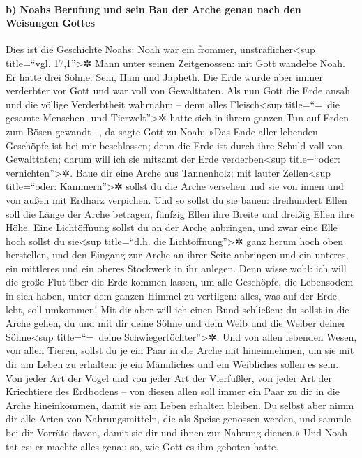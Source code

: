 \hypertarget{b-noahs-berufung-und-sein-bau-der-arche-genau-nach-den-weisungen-gottes}{%
\paragraph{b) Noahs Berufung und sein Bau der Arche genau nach den
Weisungen
Gottes}\label{b-noahs-berufung-und-sein-bau-der-arche-genau-nach-den-weisungen-gottes}}

 Dies ist die Geschichte Noahs: Noah war ein frommer,
unsträflicher\textless sup title=``vgl. 17,1''\textgreater✲ Mann unter
seinen Zeitgenossen: mit Gott wandelte Noah.  Er hatte
drei Söhne: Sem, Ham und Japheth.  Die Erde wurde aber
immer verderbter vor Gott und war voll von Gewalttaten. 
Als nun Gott die Erde ansah und die völlige Verderbtheit wahrnahm --
denn alles Fleisch\textless sup title=``=~die gesamte Menschen- und
Tierwelt''\textgreater✲ hatte sich in ihrem ganzen Tun auf Erden zum
Bösen gewandt --,  da sagte Gott zu Noah: »Das Ende aller
lebenden Geschöpfe ist bei mir beschlossen; denn die Erde ist durch ihre
Schuld voll von Gewalttaten; darum will ich sie mitsamt der Erde
verderben\textless sup title=``oder: vernichten''\textgreater✲.
 Baue dir eine Arche aus Tannenholz; mit lauter
Zellen\textless sup title=``oder: Kammern''\textgreater✲ sollst du die
Arche versehen und sie von innen und von außen mit Erdharz verpichen.
 Und so sollst du sie bauen: dreihundert Ellen soll die
Länge der Arche betragen, fünfzig Ellen ihre Breite und dreißig Ellen
ihre Höhe.  Eine Lichtöffnung sollst du an der Arche
anbringen, und zwar eine Elle hoch sollst du sie\textless sup
title=``d.h. die Lichtöffnung''\textgreater✲ ganz herum hoch oben
herstellen, und den Eingang zur Arche an ihrer Seite anbringen und ein
unteres, ein mittleres und ein oberes Stockwerk in ihr anlegen.
 Denn wisse wohl: ich will die große Flut über die Erde
kommen lassen, um alle Geschöpfe, die Lebensodem in sich haben, unter
dem ganzen Himmel zu vertilgen: alles, was auf der Erde lebt, soll
umkommen!  Mit dir aber will ich einen Bund schließen: du
sollst in die Arche gehen, du und mit dir deine Söhne und dein Weib und
die Weiber deiner Söhne\textless sup title=``=~deine
Schwiegertöchter''\textgreater✲.  Und von allen lebenden
Wesen, von allen Tieren, sollst du je ein Paar in die Arche mit
hineinnehmen, um sie mit dir am Leben zu erhalten: je ein Männliches und
ein Weibliches sollen es sein.  Von jeder Art der Vögel
und von jeder Art der Vierfüßler, von jeder Art der Kriechtiere des
Erdbodens -- von diesen allen soll immer ein Paar zu dir in die Arche
hineinkommen, damit sie am Leben erhalten bleiben.  Du
selbst aber nimm dir alle Arten von Nahrungsmitteln, die als Speise
genossen werden, und sammle bei dir Vorräte davon, damit sie dir und
ihnen zur Nahrung dienen.«  Und Noah tat es; er machte
alles genau so, wie Gott es ihm geboten hatte.

